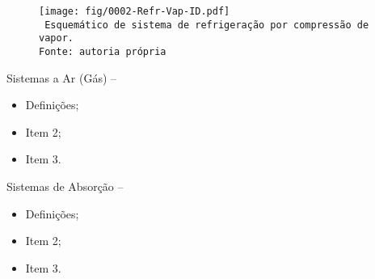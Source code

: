     \begin{frame}\vspace*{-0em}
        \begin{center}
            \begin{figure}
                \fontsize{3.0}{4}\selectfont
                \texttt{[image: fig/0002-Refr-Vap-ID.pdf]}
                \\\vspace*{-0.0em}\texttt{%
                    Esquemático de sistema de refrigeração por compressão de vapor.\\
                    Fonte: autoria própria
                }
            \end{figure}
        \end{center}
    \end{frame}

    \begin{frame}[allowframebreaks]{Sistemas a Ar (Gás) -- }\vspace*{-0em}
        \begin{itemize}
            \item<1-> Definições;
            \item<1-> Item 2;
            \item<1-> Item 3.
        \end{itemize}
    \end{frame}

    \begin{frame}[allowframebreaks]{Sistemas de Absorção -- }\vspace*{-0em}
        \begin{itemize}
            \item<1-> Definições;
            \item<1-> Item 2;
            \item<1-> Item 3.
        \end{itemize}
    \end{frame}

